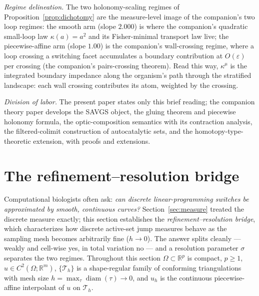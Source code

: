 \documentclass[11pt,a4paper]{article}
\theoremstyle{plain}
\theoremstyle{definition}
\theoremstyle{remark}
\newcommand{\kmu}{\kappa^{\mu}}
\newcommand{\RR}{\mathbb{R}}
\begin{document}
\emph{Regime delineation.} The two holonomy-scaling regimes of
Proposition~\ref{prop:dichotomy} are the measure-level image of the
companion's two loop regimes: the smooth arm (slope $2.000$) is
where the companion's quadratic small-loop law $\kappa(a) = a^{2}$
and its Fisher-minimal transport law live; the piecewise-affine
arm (slope $1.00$) is the companion's wall-crossing regime, where
a loop crossing a switching facet accumulates a boundary
contribution at $O(\varepsilon)$ per crossing (the companion's
pairs-crossing theorem). Read this way, $\kmu$ is the integrated
boundary impedance along the organism's path through the stratified
landscape: each wall crossing contributes its atom, weighted by
the crossing.

\emph{Division of labor.} The present paper states only this brief
reading; the companion theory paper develops the SAVGS object, the
gluing theorem and piecewise holonomy formula, the
optic-composition semantics with its contraction analysis, the
filtered-colimit construction of autocatalytic sets, and the
homotopy-type-theoretic extension, with proofs and extensions.

\section{The refinement--resolution bridge}
\label{sec:theoremB}

Computational biologists often ask: \emph{can discrete
linear-programming switches be approximated by smooth, continuous
curves?} Section~\ref{sec:measure} treated the discrete measure
exactly; this section establishes the \emph{refinement--resolution
bridge}, which characterizes how discrete active-set jump measures
behave as the sampling mesh becomes arbitrarily fine ($h \to 0$).
The answer splits cleanly --- weakly and cell-wise yes,
in total variation no --- and a resolution parameter $\sigma$ separates
the two regimes. Throughout this section $\Omega \subset \RR^p$ is compact, $p \ge 1$,
$u \in C^2(\Omega; \RR^m)$, $\{\mathcal{T}_h\}$ is a shape-regular family
of conforming triangulations with mesh size
$h = \max_\tau \operatorname{diam}(\tau) \to 0$, and $u_h$ is the
continuous piecewise-affine interpolant of $u$ on $\mathcal{T}_h$.
\end{document}
